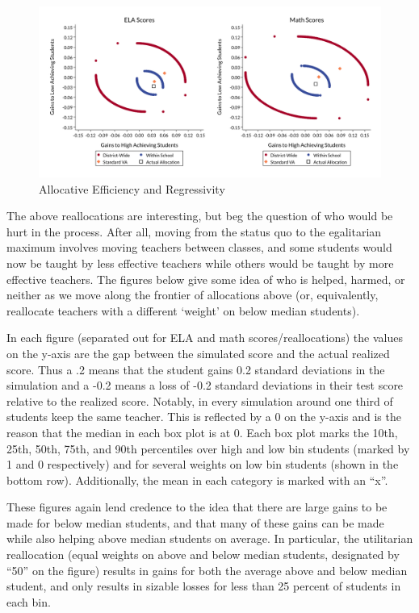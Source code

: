 \documentclass{article}
\theoremstyle{definition}
\theoremstyle{definition}
\theoremstyle{definition}
\theoremstyle{definition}
\begin{document}
\begin{figure}[H]
    \centering
    \includegraphics[width=.95\textwidth]{Working_Paper/WP_Figures/fig3d_reallocation.pdf}
    \caption{Allocative Efficiency and Regressivity}
    \label{fig:my_label}
\end{figure}


	The above reallocations are interesting, but beg the question of who would be hurt in the process. After all, moving from the status quo to the egalitarian maximum involves moving teachers between classes, and some students would now be taught by less effective teachers while others would be taught by more effective teachers. The figures below give some idea of who is helped, harmed, or neither as we move along the frontier of allocations above (or, equivalently, reallocate teachers with a different ‘weight’ on below median students).
	
	In each figure (separated out for ELA and math scores/reallocations) the values on the y-axis are the gap between the simulated score and the actual realized score. Thus a .2 means that the student gains 0.2 standard deviations in the simulation and a -0.2 means a loss of -0.2 standard deviations in their test score relative to the realized score. Notably, in every simulation around one third of students keep the same teacher. This is reflected by a 0 on the y-axis and is the reason that the median in each box plot is at 0. Each box plot marks the 10th, 25th, 50th, 75th, and 90th percentiles over high and low bin students (marked by 1 and 0 respectively) and for several weights on low bin students (shown in the bottom row). Additionally, the mean in each category is marked with an “x”.

	These figures again lend credence to the idea that there are large gains to be made for below median students, and that many of these gains can be made while also helping above median students on average. In particular, the utilitarian reallocation (equal weights on above and below median students, designated by “50” on the figure) results in gains for both the average above and below median student, and only results in sizable losses for less than 25 percent of students in each bin. 
\end{document}
